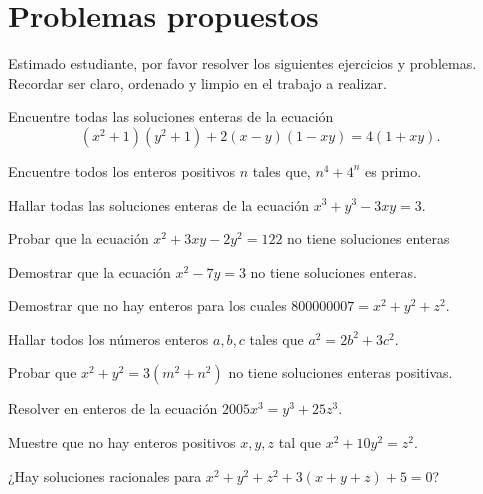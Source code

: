 \section{Problemas propuestos}

Estimado estudiante, por favor resolver los siguientes ejercicios y problemas.
Recordar ser claro, ordenado y limpio en el trabajo a realizar.

\begin{exercise}
    Encuentre todas las soluciones enteras de la ecuación
    \[
        (x^2 + 1)(y^2 + 1) + 2(x - y)(1 - xy) = 4(1 + xy).
    \]
\end{exercise}

\begin{exercise}
    Encuentre todos los enteros positivos $n$ tales que, $n^4 + 4^n$ es primo.
\end{exercise}

\begin{exercise}
    Hallar todas las soluciones enteras de la ecuación $x^3 + y^3 - 3xy = 3$.
\end{exercise}

\begin{exercise}
    Probar que la ecuación $x^2 + 3xy - 2y^2 = 122$ no tiene soluciones enteras
\end{exercise}

\begin{exercise}
    Demostrar que la ecuación $x^2 - 7y = 3$ no tiene soluciones enteras.
\end{exercise}

\begin{exercise}
    Demostrar que no hay enteros para los cuales $800000007 = x^2 + y^2 + z^2$.
\end{exercise}

\begin{exercise}
    Hallar todos los números enteros $a,b,c$ tales que $a^2 = 2b^2 + 3c^2$.
\end{exercise}

\begin{exercise}
    Probar que $x^2 + y^2 = 3(m^2 + n^2)$ no tiene soluciones enteras positivas.
\end{exercise}

\begin{exercise}
    Resolver en enteros de la ecuación $2005x^3 = y^3 + 25z^3$.
\end{exercise}

\begin{exercise}
    Muestre que no hay enteros positivos $x,y,z$ tal que $x^2 + 10y^2 = z^2$.
\end{exercise}

\begin{problem}
    ¿Hay soluciones racionales para $x^2+ y^2 + z^2 + 3(x+y+z) + 5 = 0$?
\end{problem}
